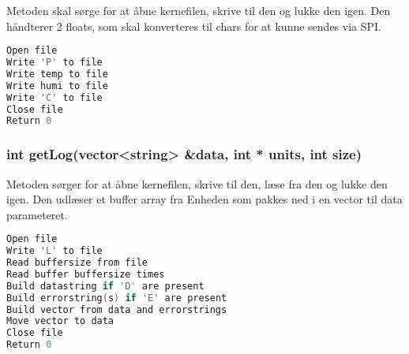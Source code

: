 Metoden skal sørge for at åbne kernefilen, skrive til den og lukke den igen.
Den håndterer 2 floats, som skal konverteres til chars for at kunne sendes via SPI.

\begin{lstlisting}[language=C]
Open file
Write 'P' to file
Write temp to file
Write humi to file
Write 'C' to file
Close file
Return 0
\end{lstlisting} 
\subsubsection*{int getLog(vector<string> \&data, int * units, int size)}

Metoden sørger for at åbne kernefilen, skrive til den, læse fra den og lukke den igen.
Den udlæser et buffer array fra Enheden som pakkes ned i en vector til data parameteret.

\begin{lstlisting}[language=C]
Open file
Write 'L' to file
Read buffersize from file
Read buffer buffersize times
Build datastring if 'D' are present
Build errorstring(s) if 'E' are present
Build vector from data and errorstrings
Move vector to data
Close file
Return 0
\end{lstlisting} 